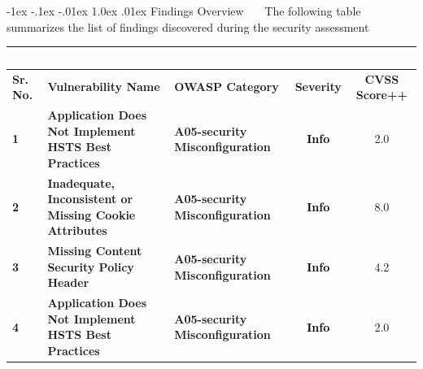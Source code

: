 \documentclass{article}
\makeatletter
\renewcommand{\section}{\@startsection{section}{1}{\z@}%
            {-1ex \@plus -.1ex \@minus -.01ex}%
            {1.0ex \@plus  .01ex}%
            {\normalfont\large\bfseries\color{sectioncolor}}}
\makeatother
\begin{document}
            \section{\large Findings Overview}
            \ \  \ The following table summarizes the list of findings discovered during the security assessment
            \begin{center}
                \begin{longtable} {|p{3em}|p{15em}|p{6em}|c|c|}
                    \hline 
                    \multicolumn{5}{|p{40em}|}{\large \cellcolor{tablecol} \textcolor{white}{\textbf{Summary Table}}} \\
                    \hline
                    \normalsize \cellcolor{tableco2} \textbf{Sr. No.} & \normalsize \cellcolor{tableco2} \textbf{Vulnerability Name} & \normalsize \cellcolor{tableco2} \textbf{OWASP Category} & \normalsize \cellcolor{tableco2} \textbf{Severity} & \normalsize \cellcolor{tableco2} \textbf{CVSS Score++} \\    
                    \hline
                    
                    \normalsize \center \textbf{1} & \normalsize \textbf{Application Does Not Implement HSTS Best Practices} & \normalsize \textbf{A05-security Misconfiguration} & \normalsize \textbf{\textcolor{infotext}{Info}} &  2.0 \\
                    \hline
                    

                    \normalsize \center \textbf{2} & \normalsize \textbf{Inadequate, Inconsistent or Missing Cookie Attributes} & \normalsize \textbf{A05-security Misconfiguration} & \normalsize \textbf{\textcolor{infotext}{Info}} &  8.0 \\
                    \hline
                    

                    \normalsize \center \textbf{3} & \normalsize \textbf{Missing Content Security Policy Header} & \normalsize \textbf{A05-security Misconfiguration} & \normalsize \textbf{\textcolor{infotext}{Info}} &  4.2 \\
                    \hline
                    

                    \normalsize \center \textbf{4} & \normalsize \textbf{Application Does Not Implement HSTS Best Practices} & \normalsize \textbf{A05-security Misconfiguration} & \normalsize \textbf{\textcolor{infotext}{Info}} &  2.0 \\
                    \hline
                     
                \end{longtable}   
            \end{center}
            
\end{document}
